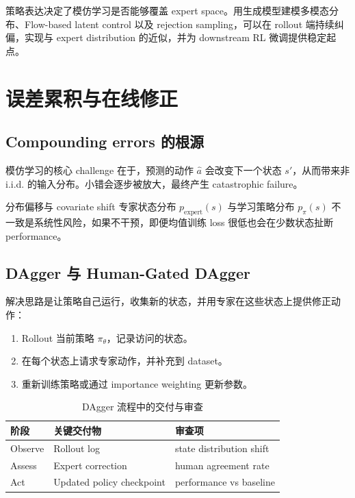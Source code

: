 \documentclass[a4paper]{article}
\begin{document}
策略表达决定了模仿学习是否能够覆盖 expert space。用生成模型建模多模态分布、Flow-based latent control 以及 rejection sampling，可以在 rollout 端持续纠偏，实现与 expert distribution 的近似，并为 downstream RL 微调提供稳定起点。

\section{误差累积与在线修正}

\subsection{Compounding errors 的根源}

模仿学习的核心 challenge 在于，预测的动作 $\hat{a}$ 会改变下一个状态 $s'$，从而带来非 i.i.d. 的输入分布。小错会逐步被放大，最终产生 catastrophic failure。

\begin{warningbox}{分布偏移与 covariate shift}
专家状态分布 $p_{\text{expert}}(s)$ 与学习策略分布 $p_{\pi}(s)$ 不一致是系统性风险，如果不干预，即便均值训练 loss 很低也会在少数状态扯断 performance。
\end{warningbox}

\subsection{DAgger 与 Human-Gated DAgger}

解决思路是让策略自己运行，收集新的状态，并用专家在这些状态上提供修正动作：
\begin{enumerate}
    \item Rollout 当前策略 $\pi_\theta$，记录访问的状态。
    \item 在每个状态上请求专家动作，并补充到 dataset。
    \item 重新训练策略或通过 importance weighting 更新参数。
\end{enumerate}

\begin{table}[H]
\centering
\begin{tabular}{p{} p{} p{}}
\toprule
阶段 & 关键交付物 & 审查项 \\
\midrule
Observe & Rollout log & state distribution shift \\
Assess & Expert correction & human agreement rate \\
Act & Updated policy checkpoint & performance vs baseline \\
\bottomrule
\end{tabular}
\caption{DAgger 流程中的交付与审查}
\end{table}
\end{document}

